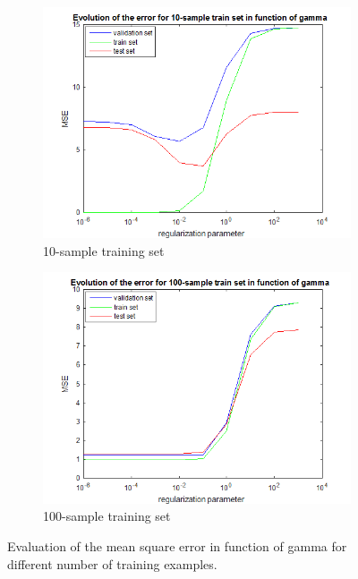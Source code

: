 \documentclass{article} %
\begin{document}
\begin{figure}[h]
    \centering
    \begin{subfigure}[b]{0.45\textwidth}
        \includegraphics[width=\textwidth]{ex6_10}
        \caption{10-sample training set}
    \end{subfigure}
    \begin{subfigure}[b]{0.45\textwidth}
        \includegraphics[width=\textwidth]{ex6_100}
        \caption{100-sample training set}
    \end{subfigure}
    \caption{Evaluation of the mean square error in function of gamma for different number of training examples.}
    \label{fig:ex6}
\end{figure}
\end{document}
